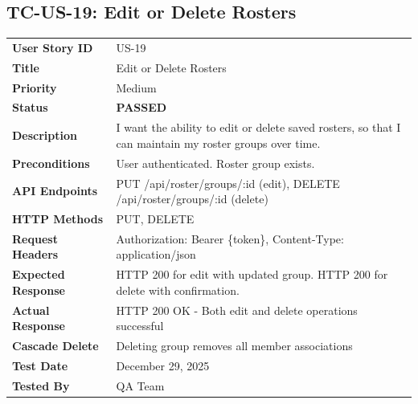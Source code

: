 \documentclass[11pt,a4paper]{article}
\newcommand{\passed}{\textcolor{pass}{\textbf{PASSED}}}
\begin{document}
\vspace{0.5cm}


\subsection{TC-US-19: Edit or Delete Rosters}

\begin{tabularx}{\textwidth}{|p{3.2cm}|Y|}
\hline
{}
 \\
\hline
\textbf{User Story ID} & US-19 \\
\hline
\textbf{Title} & Edit or Delete Rosters \\
\hline
\textbf{Priority} & Medium \\
\hline
\textbf{Status} & \passed \\
\hline
\textbf{Description} & I want the ability to edit or delete saved rosters, so that I can maintain my roster groups over time. \\
\hline
\textbf{Preconditions} & User authenticated. Roster group exists. \\
\hline
\textbf{API Endpoints} & PUT /api/roster/groups/:id (edit), DELETE /api/roster/groups/:id (delete) \\
\hline
\textbf{HTTP Methods} & PUT, DELETE \\
\hline
\textbf{Request Headers} & Authorization: Bearer \{token\}, Content-Type: application/json \\
\hline
\textbf{Expected Response} & HTTP 200 for edit with updated group. HTTP 200 for delete with confirmation. \\
\hline
\textbf{Actual Response} & HTTP 200 OK - Both edit and delete operations successful \\
\hline
\textbf{Cascade Delete} & Deleting group removes all member associations \\
\hline
\textbf{Test Date} & December 29, 2025 \\
\hline
\textbf{Tested By} & QA Team \\
\hline
\end{tabularx}
\end{document}
